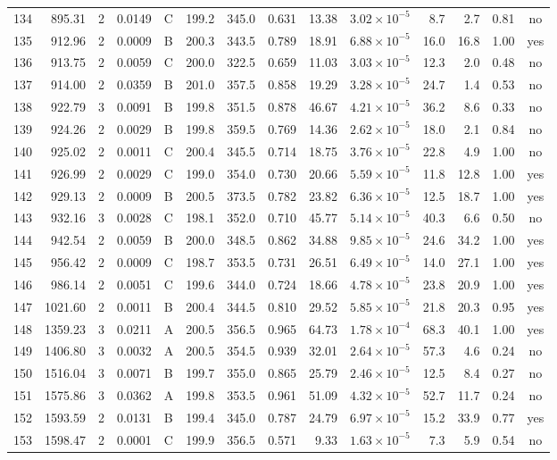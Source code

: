 \begin{landscape}
\begin{longtable}{rrrrlrrrrrrrrc}
134 & 895.31 & 2 & 0.0149 & C & 199.2 & 345.0 & 0.631 & 13.38 & $3.02\times10^{-5}$ & 8.7 & 2.7 & 0.81 & no \\
135 & 912.96 & 2 & 0.0009 & B & 200.3 & 343.5 & 0.789 & 18.91 & $6.88\times10^{-5}$ & 16.0 & 16.8 & 1.00 & yes \\
136 & 913.75 & 2 & 0.0059 & C & 200.0 & 322.5 & 0.659 & 11.03 & $3.03\times10^{-5}$ & 12.3 & 2.0 & 0.48 & no \\
137 & 914.00 & 2 & 0.0359 & B & 201.0 & 357.5 & 0.858 & 19.29 & $3.28\times10^{-5}$ & 24.7 & 1.4 & 0.53 & no \\
138 & 922.79 & 3 & 0.0091 & B & 199.8 & 351.5 & 0.878 & 46.67 & $4.21\times10^{-5}$ & 36.2 & 8.6 & 0.33 & no \\
139 & 924.26 & 2 & 0.0029 & B & 199.8 & 359.5 & 0.769 & 14.36 & $2.62\times10^{-5}$ & 18.0 & 2.1 & 0.84 & no \\
140 & 925.02 & 2 & 0.0011 & C & 200.4 & 345.5 & 0.714 & 18.75 & $3.76\times10^{-5}$ & 22.8 & 4.9 & 1.00 & no \\
141 & 926.99 & 2 & 0.0029 & C & 199.0 & 354.0 & 0.730 & 20.66 & $5.59\times10^{-5}$ & 11.8 & 12.8 & 1.00 & yes \\
142 & 929.13 & 2 & 0.0009 & B & 200.5 & 373.5 & 0.782 & 23.82 & $6.36\times10^{-5}$ & 12.5 & 18.7 & 1.00 & yes \\
143 & 932.16 & 3 & 0.0028 & C & 198.1 & 352.0 & 0.710 & 45.77 & $5.14\times10^{-5}$ & 40.3 & 6.6 & 0.50 & no \\
144 & 942.54 & 2 & 0.0059 & B & 200.0 & 348.5 & 0.862 & 34.88 & $9.85\times10^{-5}$ & 24.6 & 34.2 & 1.00 & yes \\
145 & 956.42 & 2 & 0.0009 & C & 198.7 & 353.5 & 0.731 & 26.51 & $6.49\times10^{-5}$ & 14.0 & 27.1 & 1.00 & yes \\
146 & 986.14 & 2 & 0.0051 & C & 199.6 & 344.0 & 0.724 & 18.66 & $4.78\times10^{-5}$ & 23.8 & 20.9 & 1.00 & yes \\
147 & 1021.60 & 2 & 0.0011 & B & 200.4 & 344.5 & 0.810 & 29.52 & $5.85\times10^{-5}$ & 21.8 & 20.3 & 0.95 & yes \\
148 & 1359.23 & 3 & 0.0211 & A & 200.5 & 356.5 & 0.965 & 64.73 & $1.78\times10^{-4}$ & 68.3 & 40.1 & 1.00 & yes \\
149 & 1406.80 & 3 & 0.0032 & A & 200.5 & 354.5 & 0.939 & 32.01 & $2.64\times10^{-5}$ & 57.3 & 4.6 & 0.24 & no \\
150 & 1516.04 & 3 & 0.0071 & B & 199.7 & 355.0 & 0.865 & 25.79 & $2.46\times10^{-5}$ & 12.5 & 8.4 & 0.27 & no \\
151 & 1575.86 & 3 & 0.0362 & A & 199.8 & 353.5 & 0.961 & 51.09 & $4.32\times10^{-5}$ & 52.7 & 11.7 & 0.24 & no \\
152 & 1593.59 & 2 & 0.0131 & B & 199.4 & 345.0 & 0.787 & 24.79 & $6.97\times10^{-5}$ & 15.2 & 33.9 & 0.77 & yes \\
153 & 1598.47 & 2 & 0.0001 & C & 199.9 & 356.5 & 0.571 & 9.33 & $1.63\times10^{-5}$ & 7.3 & 5.9 & 0.54 & no \\
\end{longtable}
\end{landscape}
